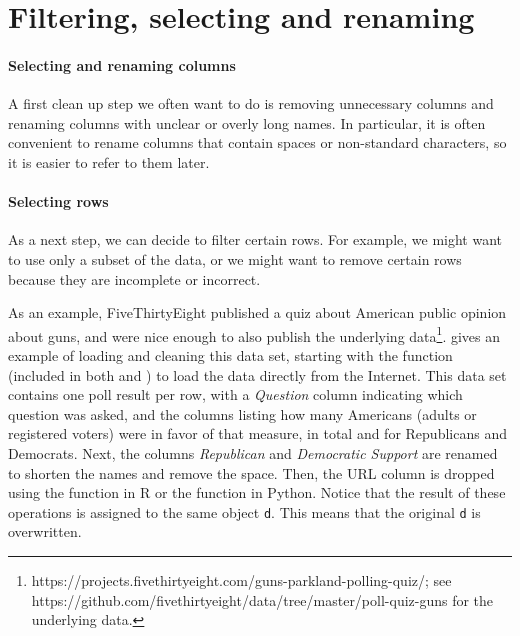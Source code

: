 \section{Filtering, selecting and renaming}


\paragraph{Selecting and renaming columns}
A first clean up step we often want to do is removing unnecessary columns and renaming columns with unclear or overly long names.
In particular, it is often convenient to rename columns that contain spaces or non-standard characters, so it is easier to refer to them later.

\paragraph{Selecting rows}
As a next step, we can decide to filter certain rows.
For example, we might want to use only a subset of the data,
or we might want to remove certain rows because they are incomplete or incorrect.

As an example, FiveThirtyEight published a quiz about American public opinion about guns,
and were nice enough to also publish the underlying data\footnote{https://projects.fivethirtyeight.com/guns-parkland-polling-quiz/; see https://github.com/fivethirtyeight/data/tree/master/poll-quiz-guns for the underlying data.}.
 gives an example of loading and cleaning this data set, starting with the function  (included in both  and ) to load the data directly from the Internet.
This data set contains one poll result per row, with a \emph{Question} column indicating which question was asked,
and the columns listing how many Americans (adults or registered voters) were in favor of that measure, in total and for Republicans and Democrats.
Next, the columns \emph{Republican} and \emph{Democratic Support} are renamed to shorten the names and remove the space.
Then, the URL column is dropped using the  function  in R or the  function  in Python.
Notice that the result of these operations is assigned to the same object \texttt{d}.
This means that the original \texttt{d} is overwritten.

  
